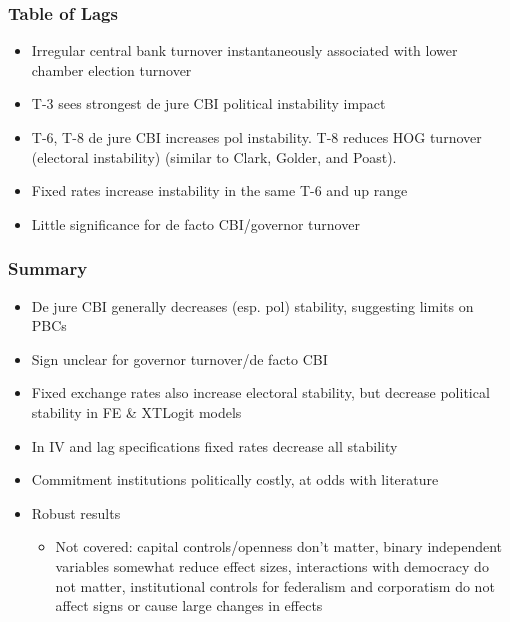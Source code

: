 \documentclass[]{beamer}
\begin{document}
\begin{frame}
    \frametitle{Table of Lags}
    \begin{itemize}
        \item Irregular central bank turnover instantaneously associated with lower chamber election turnover
        \item T-3 sees strongest de jure CBI political instability impact
        \item T-6, T-8 de jure CBI increases pol instability. T-8 reduces HOG turnover (electoral instability) (similar to Clark, Golder, and Poast).
        \item Fixed rates increase instability in the same T-6 and up range
        \item Little significance for de facto CBI/governor turnover
    \end{itemize}
\end{frame}


\begin{frame}
    \frametitle{Summary}
    \begin{itemize}
        \item De jure CBI generally decreases (esp. pol) stability, suggesting limits on PBCs
        \item Sign unclear for governor turnover/de facto CBI
        \item Fixed exchange rates also increase electoral stability, but decrease political stability in FE \& XTLogit models
        \item In IV and lag specifications fixed rates decrease all stability
        \item Commitment institutions politically costly, at odds with literature
        \item Robust results
        \begin{itemize}
            \item Not covered: capital controls/openness don’t matter, binary independent variables somewhat reduce effect sizes, interactions with democracy do not matter, institutional controls for federalism and corporatism do not affect signs or cause large changes in effects
        \end{itemize}
    \end{itemize}
\end{frame}
\end{document}
